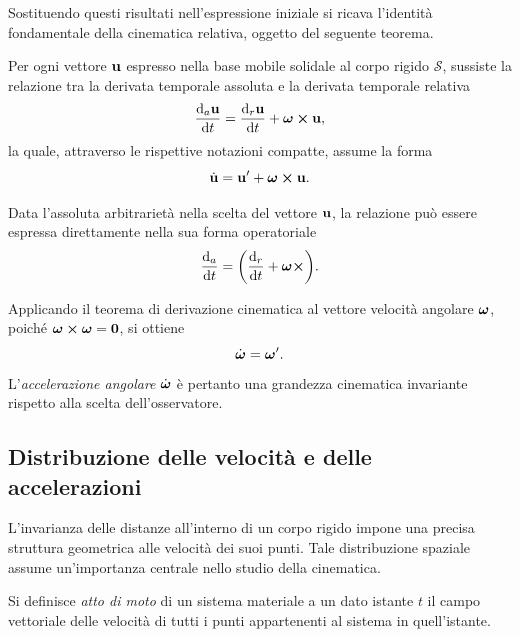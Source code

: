 Sostituendo questi risultati nell'espressione iniziale si ricava l'identità fondamentale della cinematica relativa, oggetto del seguente teorema.

\begin{theorem}
    Per ogni vettore $\vb{u}$ espresso nella base mobile solidale al corpo rigido $\mathcal{S}$, sussiste la relazione tra la derivata temporale assoluta e la derivata temporale relativa
    \begin{equation*}
        \dva{\vvu}{t} = \dvr{\vvu}{t} + \vb*{\omega} \cross \vvu,
    \end{equation*}
    la quale, attraverso le rispettive notazioni compatte, assume la forma
    \begin{equation*}
        \dot{\vb{u}} = \vb{u}' + \vb*{\omega} \cross \vb{u}.
    \end{equation*}
\end{theorem}

Data l'assoluta arbitrarietà nella scelta del vettore $\vb{u}$, la relazione può essere espressa direttamente nella sua forma operatoriale
\begin{equation*}
    \dva{t} = \qty(\dvr{t} + \vb*{\omega} \cross).
\end{equation*}

\begin{remark}
    Applicando il teorema di derivazione cinematica al vettore velocità angolare $\vb*{\omega}$, poiché $\vb*{\omega} \cross \vb*{\omega} = \vb{0}$, si ottiene
    \begin{equation*}
        \dot{\vb*{\omega}} = \vb*{\omega}'.
    \end{equation*}
    L'\emph{accelerazione angolare} $\dot{\vb*{\omega}}$ è pertanto una grandezza cinematica invariante rispetto alla scelta dell'osservatore.
\end{remark}

\subsection{Distribuzione delle velocità e delle accelerazioni}

L'invarianza delle distanze all'interno di un corpo rigido impone una precisa struttura geometrica alle velocità dei suoi punti. Tale distribuzione spaziale assume un'importanza centrale nello studio della cinematica.

\begin{definition}
    Si definisce \emph{atto di moto} di un sistema materiale a un dato istante $t$ il campo vettoriale delle velocità di tutti i punti appartenenti al sistema in quell'istante.
\end{definition}

